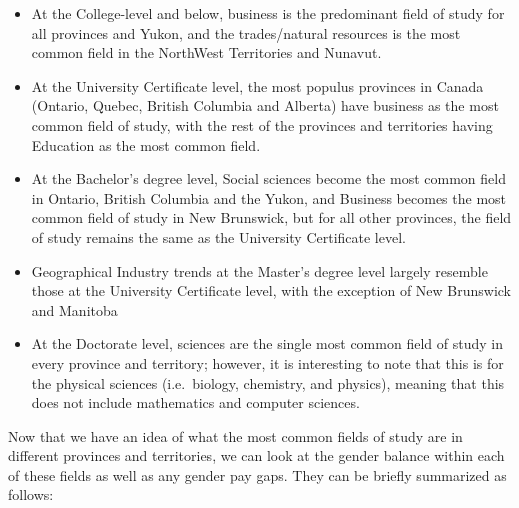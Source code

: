 \documentclass[]{article}
\providecommand{\tightlist}{%
  \setlength{\itemsep}{0pt}\setlength{\parskip}{0pt}}
\begin{document}
\begin{itemize}
\tightlist
\item
  At the College-level and below, business is the predominant field of
  study for all provinces and Yukon, and the trades/natural resources is
  the most common field in the NorthWest Territories and Nunavut.
\item
  At the University Certificate level, the most populus provinces in
  Canada (Ontario, Quebec, British Columbia and Alberta) have business
  as the most common field of study, with the rest of the provinces and
  territories having Education as the most common field.
\item
  At the Bachelor's degree level, Social sciences become the most common
  field in Ontario, British Columbia and the Yukon, and Business becomes
  the most common field of study in New Brunswick, but for all other
  provinces, the field of study remains the same as the University
  Certificate level.
\item
  Geographical Industry trends at the Master's degree level largely
  resemble those at the University Certificate level, with the exception
  of New Brunswick and Manitoba
\item
  At the Doctorate level, sciences are the single most common field of
  study in every province and territory; however, it is interesting to
  note that this is for the physical sciences (i.e.~biology, chemistry,
  and physics), meaning that this does not include mathematics and
  computer sciences.
\end{itemize}

Now that we have an idea of what the most common fields of study are in
different provinces and territories, we can look at the gender balance
within each of these fields as well as any gender pay gaps. They can be
briefly summarized as follows:
\end{document}
